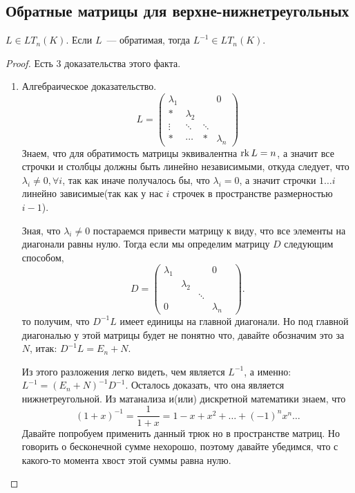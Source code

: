 \subsection{Обратные матрицы для верхне-нижнетреугольных}
\begin{statement}
     $L\in LT_n(K)$. Если $L$~--- обратимая, тогда $L^{-1}\in LT_n(K)$.
\end{statement}
\begin{proof}
    Есть 3 доказательства этого факта.
    \begin{enumerate}
        \item Алгебраическое доказательство.\\
            $$L = 
            \begin{pmatrix}
                \lambda_1&&&0\\
                *&\lambda_2&&\\
                \vdots&\ddots&\ddots&\\
                *&\cdots&*&\lambda_n
            \end{pmatrix}$$
            Знаем, что для обратимость матрицы эквивалентна $\operatorname{rk} L = n$, а значит все строчки и столбцы
            должны быть линейно независимыми, откуда следует, что $\lambda_i \not= 0, \forall i$, так как иначе
            получалось бы, что $\lambda_i = 0$, а значит строчки $1\dots i$ линейно зависимые(так как
            у нас $i$ строчек в пространстве размерностью $i - 1$).

            Зная, что $\lambda_i \not= 0$ постараемся привести матрицу к виду, что все элементы на диагонали 
            равны нулю.
            Тогда если мы определим матрицу $D$ следующим способом,
            \[
            D = \begin{pmatrix}
                \lambda_1&&&0\\
                &\lambda_2&&\\
                &&\ddots&&\\
                0&&&\lambda_n
            \end{pmatrix}
            .\] 
            то получим, что $D^{-1} L$ имеет единицы на главной диагонали. Но под главной диагональю у этой матрицы будет
            не понятно что, давайте обозначим это за $N$, итак: $D^{-1}L = E_n + N$.

            Из этого разложения легко видеть, чем является $L^{-1}$, а именно: $L^{-1} = (E_n + N)^{-1}D^{-1}$.
            Осталось доказать, что она является нижнетреугольной.
            Из матанализа и(или) дискретной математики знаем, что 
            \[
                (1 + x)^{-1} = \frac{1}{1+x} = 1 - x + x^2 +\dots +(-1)^nx^n\dots
            \]
            Давайте попробуем применить данный трюк но в пространстве матриц.
            Но говорить о бесконечной сумме нехорошо, поэтому давайте убедимся,
            что с какого-то момента хвост этой суммы равна нулю.


\end{enumerate}
\end{proof}
